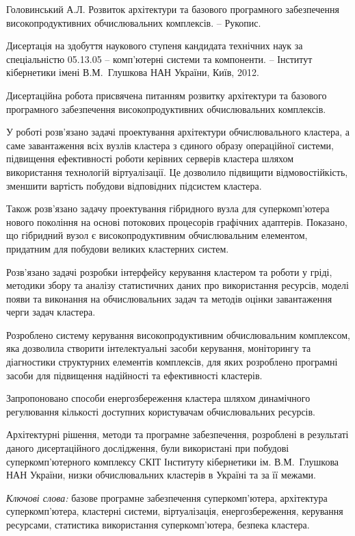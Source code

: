 Головинський А.Л. Розвиток архітектури та базового програмного забезпечення високопродуктивних обчислювальних комплексів. -- Рукопис.

Дисертація на здобуття наукового ступеня кандидата технічних наук за спеціальністю 05.13.05 -- комп'ютерні системи та компоненти. -- Інститут кібернетики імені В.М.~Глушкова НАН України, Київ, 2012.

Дисертаційна робота присвячена питанням розвитку архітектури та базового програмного забезпечення високопродуктивних обчислювальних комплексів.

У роботі розв'язано задачі проектування архітектури обчислювального кластера, а саме завантаження всіх вузлів кластера з єдиного образу операційної системи, підвищення ефективності роботи керівних серверів кластера шляхом використання технологій віртуалізації. Це дозволило підвищити відмовостійкість, зменшити вартість побудови відповідних підсистем кластера.

Також розв'язано задачу проектування гібридного вузла для суперкомп'ютера нового покоління на основі потокових процесорів графічних адаптерів. Показано, що гібридний вузол є високопродуктивним обчислювальним елементом, придатним для побудови великих кластерних систем.

Розв'язано задачі розробки інтерфейсу керування кластером та роботи у гріді, методики збору та аналізу статистичних даних про використання ресурсів, моделі появи та виконання на обчислювальних задач та методів оцінки завантаження черги задач кластера.

Розроблено систему керування високопродуктивним обчислювальним комплексом, яка дозволила створити інтелектуальні засоби керування, моніторингу та діагностики структурних елементів комплексів, для яких розроблено програмні засоби для підвищення надійності та ефективності кластерів.

Запропоновано способи енергозбереження кластера шляхом динамічного регулювання кількості доступних користувачам обчислювальних ресурсів.

Архітектурні рішення, методи та програмне забезпечення, розроблені в результаті даного дисертаційного дослідження, були використані при побудові суперкомп'ютерного комплексу СКІТ Інституту кібернетики ім. В.М.~Глушкова НАН України, низки обчислювальних кластерів в Україні та за її межами.

\textit{Ключові слова:} базове програмне забезпечення суперкомп'ютера, архітектура суперкомп'ютера, кластерні системи, віртуалізація, енергозбереження, керування ресурсами, статистика використання суперкомп'ютера, безпека кластера.

